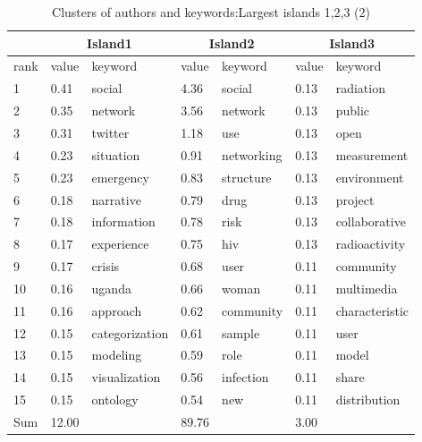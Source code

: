\documentclass[11pt]{article} %
\begin{document}
\begin{table}
\caption{Clusters of authors and keywords:\label{ak2} Largest islands 1,2,3 (2)}\medskip
\renewcommand{\arraystretch}{0.95}
\begin{center}
\begin{tabular}{p{1cm}|p{1cm}|p{2cm}|p{1cm}|p{2cm}|p{1cm}|p{2cm}}
& \multicolumn{2}{c}{Island1} & \multicolumn{2}{c}{Island2} & \multicolumn{2}{c}{Island3}\\ \hline
rank&	value&	keyword&	value&	keyword&	value&	keyword\\ \hline
1&	0.41&	social&	4.36&	social&	0.13&	radiation\\
2&	0.35&	network&	3.56&	network&	0.13&	public\\
3&	0.31&	twitter&	1.18&	use&	0.13&	open\\
4&	0.23&	situation&	0.91&	networking&	0.13&	measurement\\
5&	0.23&	emergency&	0.83&	structure&	0.13&	environment\\
6&	0.18&	narrative&	0.79&	drug&	0.13&	project\\
7&	0.18&	information&	0.78&	risk&	0.13&	collaborative\\
8&	0.17&	experience&	0.75&	hiv&	0.13&	radioactivity\\
9&	0.17&	crisis&	0.68&	user&	0.11&	community\\
10&	0.16&	uganda&	0.66&	woman&	0.11&	multimedia\\
11&	0.16&	approach&	0.62&	community&	0.11&	characteristic\\
12&	0.15&	categorization&	0.61&	sample&	0.11&	user\\
13&	0.15&	modeling&	0.59&	role&	0.11&	model\\
14&	0.15&	visualization&	0.56&	infection&	0.11&	share\\
15&	0.15&	ontology&	0.54&	new&	0.11&	distribution\\ \hline
Sum&	12.00&		& 89.76&		& 3.00&	\\ \hline
\end{tabular}
\end{center}
\end{table}
\end{document}
